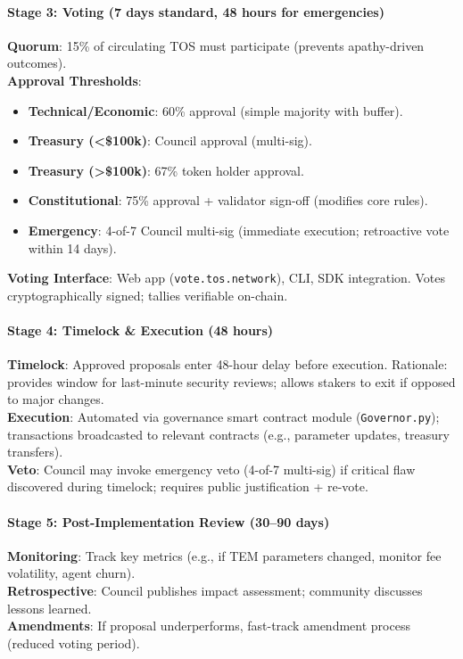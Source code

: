 \documentclass[11pt]{article}
\begin{document}
\paragraph{Stage 3: Voting (7 days standard, 48 hours for emergencies)}
\textbf{Quorum}: 15\% of circulating TOS must participate (prevents apathy-driven outcomes).\\
\textbf{Approval Thresholds}:
\begin{itemize}[noitemsep]
  \item \textbf{Technical/Economic}: 60\% approval (simple majority with buffer).
  \item \textbf{Treasury (<\$100k)}: Council approval (multi-sig).
  \item \textbf{Treasury (>\$100k)}: 67\% token holder approval.
  \item \textbf{Constitutional}: 75\% approval + validator sign-off (modifies core rules).
  \item \textbf{Emergency}: 4-of-7 Council multi-sig (immediate execution; retroactive vote within 14 days).
\end{itemize}
\textbf{Voting Interface}: Web app (\texttt{vote.tos.network}), CLI, SDK integration. Votes cryptographically signed; tallies verifiable on-chain.

\paragraph{Stage 4: Timelock \& Execution (48 hours)}
\textbf{Timelock}: Approved proposals enter 48-hour delay before execution. Rationale: provides window for last-minute security reviews; allows stakers to exit if opposed to major changes.\\
\textbf{Execution}: Automated via governance smart contract module (\texttt{Governor.py}); transactions broadcasted to relevant contracts (e.g., parameter updates, treasury transfers).\\
\textbf{Veto}: Council may invoke emergency veto (4-of-7 multi-sig) if critical flaw discovered during timelock; requires public justification + re-vote.

\paragraph{Stage 5: Post-Implementation Review (30--90 days)}
\textbf{Monitoring}: Track key metrics (e.g., if TEM parameters changed, monitor fee volatility, agent churn).\\
\textbf{Retrospective}: Council publishes impact assessment; community discusses lessons learned.\\
\textbf{Amendments}: If proposal underperforms, fast-track amendment process (reduced voting period).
\end{document}
